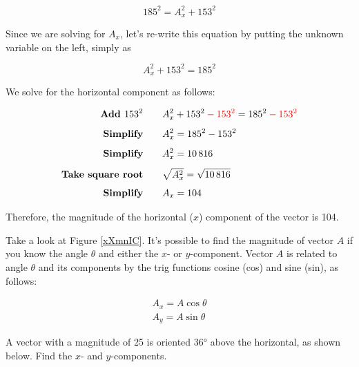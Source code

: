 \documentclass[dvipsnames]{article}
\numberwithin{equation}{section}
\numberwithin{figure}{section}
\begin{document}
\begin{equation*}
    185^2 = A_x^2 + 153^2
\end{equation*}

Since we are solving for $A_x$, let's re-write this equation by putting the unknown variable on the left, simply as 

\begin{equation*}
    A_x^2 + 153^2 = 185^2
\end{equation*}

We solve for the horizontal component as follows:

\begin{align*}
    \textbf{Add $153^2$} \qquad & A_x^2 + 153^2 \mathbin{\color{red} -} \textcolor{red}{153^2} = 185^2 \mathbin{\color{red} -} \textcolor{red}{153^2}\\[1ex]
    \textbf{Simplify} \qquad & A_x^2 = 185^2 - 153^2\\[1ex]
    \textbf{Simplify} \qquad & A_x^2 = \num{10816}\\[1ex]
    \textbf{Take square root} \qquad & \sqrt{A_x^2} = \sqrt{\num{10816}}\\[1ex]
    \textbf{Simplify} \qquad & A_x = 104
\end{align*}

Therefore, the magnitude of the horizontal ($x$) component of the vector is 104.

\solutionEnd

Take a look at Figure \ref{xXmnIC}. It's possible to find the magnitude of vector $A$ if you know the angle $\theta$ and either the $x$- or $y$-component. Vector $A$ is related to  angle $\theta$ and its components by the trig functions cosine (cos) and sine (sin), as follows:

\begin{align}
    A_x = A \cos{\theta} \label{06CyUc}\\[1ex]
    A_y = A \sin{\theta} \label{aBWDIc}
\end{align}

\begin{example}
    A vector with a magnitude of 25 is oriented \ang{36} above the horizontal, as shown below. Find the $x$- and $y$-components.
\end{example}

\begin{center}
\end{center}
\end{document}
